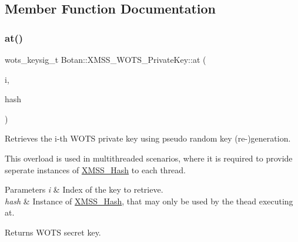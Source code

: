 \subsection{Member Function Documentation}
\mbox{\label{class_botan_1_1_x_m_s_s___w_o_t_s___private_key_ac79a078ba4db7829e1065721c8980cfa}} 
\subsubsection{\texorpdfstring{at()}{at()}\hspace{0.1cm}{\footnotesize\ttfamily [1/2]}}
{\footnotesize\ttfamily wots\+\_\+keysig\+\_\+t Botan\+::\+X\+M\+S\+S\+\_\+\+W\+O\+T\+S\+\_\+\+Private\+Key\+::at (\begin{DoxyParamCaption}\item[{size\+\_\+t}]{i,  }\item[{\hyperlink{class_botan_1_1_x_m_s_s___hash}{X\+M\+S\+S\+\_\+\+Hash} \&}]{hash }\end{DoxyParamCaption})\hspace{0.3cm}{\ttfamily [inline]}}

Retrieves the i-\/th W\+O\+TS private key using pseudo random key (re-\/)generation.

This overload is used in multithreaded scenarios, where it is required to provide seperate instances of \hyperlink{class_botan_1_1_x_m_s_s___hash}{X\+M\+S\+S\+\_\+\+Hash} to each thread.


\begin{DoxyParams}{Parameters}
{\em i} & Index of the key to retrieve. \\
\hline
{\em hash} & Instance of \hyperlink{class_botan_1_1_x_m_s_s___hash}{X\+M\+S\+S\+\_\+\+Hash}, that may only be used by the thead executing at.\\
\hline
\end{DoxyParams}
\begin{DoxyReturn}{Returns}
W\+O\+TS secret key. 
\end{DoxyReturn}
\mbox{\label{class_botan_1_1_x_m_s_s___w_o_t_s___private_key_a5d454383924b5d2613cbce18417a9808}} 
